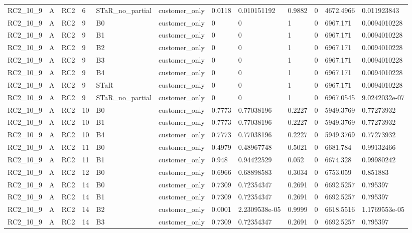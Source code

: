 \begin{longtable}{llllllllllll}
RC2\_10\_9 & A & RC2 & 6 & STaR\_no\_partial & customer\_only & 0.0118 & 0.010151192 & 0.9882 & 0 & 4672.4966 & 0.011923843 \\
RC2\_10\_9 & A & RC2 & 9 & B0 & customer\_only & 0 & 0 & 1 & 0 & 6967.171 & 0.0094010228 \\
RC2\_10\_9 & A & RC2 & 9 & B1 & customer\_only & 0 & 0 & 1 & 0 & 6967.171 & 0.0094010228 \\
RC2\_10\_9 & A & RC2 & 9 & B2 & customer\_only & 0 & 0 & 1 & 0 & 6967.171 & 0.0094010228 \\
RC2\_10\_9 & A & RC2 & 9 & B3 & customer\_only & 0 & 0 & 1 & 0 & 6967.171 & 0.0094010228 \\
RC2\_10\_9 & A & RC2 & 9 & B4 & customer\_only & 0 & 0 & 1 & 0 & 6967.171 & 0.0094010228 \\
RC2\_10\_9 & A & RC2 & 9 & STaR & customer\_only & 0 & 0 & 1 & 0 & 6967.171 & 0.0094010228 \\
RC2\_10\_9 & A & RC2 & 9 & STaR\_no\_partial & customer\_only & 0 & 0 & 1 & 0 & 6967.0545 & 9.0242032e-07 \\
RC2\_10\_9 & A & RC2 & 10 & B0 & customer\_only & 0.7773 & 0.77038196 & 0.2227 & 0 & 5949.3769 & 0.77273932 \\
RC2\_10\_9 & A & RC2 & 10 & B1 & customer\_only & 0.7773 & 0.77038196 & 0.2227 & 0 & 5949.3769 & 0.77273932 \\
RC2\_10\_9 & A & RC2 & 10 & B4 & customer\_only & 0.7773 & 0.77038196 & 0.2227 & 0 & 5949.3769 & 0.77273932 \\
RC2\_10\_9 & A & RC2 & 11 & B0 & customer\_only & 0.4979 & 0.48967748 & 0.5021 & 0 & 6681.784 & 0.99132466 \\
RC2\_10\_9 & A & RC2 & 11 & B1 & customer\_only & 0.948 & 0.94422529 & 0.052 & 0 & 6674.328 & 0.99980242 \\
RC2\_10\_9 & A & RC2 & 12 & B0 & customer\_only & 0.6966 & 0.68898583 & 0.3034 & 0 & 6753.059 & 0.851883 \\
RC2\_10\_9 & A & RC2 & 14 & B0 & customer\_only & 0.7309 & 0.72354347 & 0.2691 & 0 & 6692.5257 & 0.795397 \\
RC2\_10\_9 & A & RC2 & 14 & B1 & customer\_only & 0.7309 & 0.72354347 & 0.2691 & 0 & 6692.5257 & 0.795397 \\
RC2\_10\_9 & A & RC2 & 14 & B2 & customer\_only & 0.0001 & 2.2309538e-05 & 0.9999 & 0 & 6618.5516 & 1.1769553e-05 \\
RC2\_10\_9 & A & RC2 & 14 & B3 & customer\_only & 0.7309 & 0.72354347 & 0.2691 & 0 & 6692.5257 & 0.795397 \\

\end{longtable}

